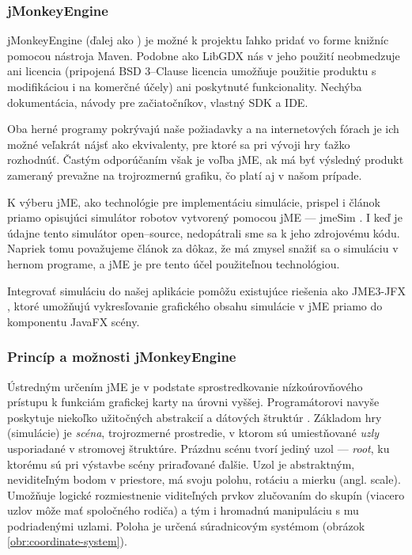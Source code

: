 \subsubsection{jMonkeyEngine}
\label{subsub:jMonekyEngine}
jMonkeyEngine (ďalej ako ) je možné k projektu ľahko pridať vo forme knižníc pomocou nástroja Maven. Podobne ako LibGDX nás v jeho použití neobmedzuje ani licencia (pripojená BSD 3--Clause licencia umožňuje použitie produktu s modifikáciou i na komerčné účely) ani poskytnuté funkcionality. Nechýba dokumentácia, návody pre začiatočníkov, vlastný SDK a IDE.

Oba herné programy pokrývajú naše požiadavky a na internetových fórach je ich možné veľakrát nájsť ako ekvivalenty, pre ktoré sa pri vývoji hry ťažko rozhodnúť. Častým odporúčaním však je voľba jME, ak má byť výsledný produkt zameraný prevažne na trojrozmernú grafiku, čo platí aj v našom prípade.

K výberu jME, ako technológie pre implementáciu simulácie, prispel i článok priamo opisujúci simulátor robotov vytvorený pomocou jME --- jmeSim \cite{jmeSim}. I keď je údajne tento simulátor open--source, nedopátrali sme sa k jeho zdrojovému kódu. Napriek tomu považujeme článok za dôkaz, že má zmysel snažiť sa o simuláciu v hernom programe, a jME je pre tento účel použiteľnou technológiou.

Integrovať simuláciu do našej aplikácie pomôžu existujúce riešenia ako JME3-JFX \cite{jmejfx}, ktoré umožňujú vykresľovanie grafického obsahu simulácie v jME priamo do komponentu JavaFX scény.

\subsubsection{Princíp a možnosti jMonkeyEngine}
Ústredným určením jME je v podstate sprostredkovanie nízkoúrovňového prístupu k funkciám grafickej karty na úrovni vyššej. Programátorovi navyše poskytuje niekoľko užitočných abstrakcií a dátových štruktúr \cite{jmeDocumentation}. Základom hry (simulácie) je \textit{scéna}, trojrozmerné prostredie, v ktorom sú umiestňované \textit{uzly} usporiadané v stromovej štruktúre. Prázdnu scénu tvorí jediný uzol --- \textit{root}, ku ktorému sú pri výstavbe scény priraďované ďalšie. Uzol je abstraktným, neviditeľným bodom v priestore, má svoju polohu, rotáciu a mierku (angl. scale). Umožňuje logické rozmiestnenie viditeľných prvkov zlučovaním do skupín (viacero uzlov môže mať spoločného rodiča) a tým i hromadnú manipuláciu s mu podriadenými uzlami. Poloha je určená súradnicovým systémom (obrázok \ref{obr:coordinate-system}).

